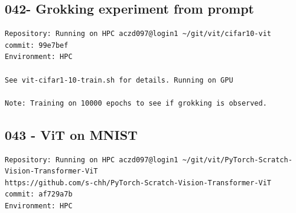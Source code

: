\subsection{042- Grokking experiment from prompt}
\label{app_res:042}
\begin{verbatim}
Repository: Running on HPC aczd097@login1 ~/git/vit/cifar10-vit
commit: 99e7bef
Environment: HPC

See vit-cifar1-10-train.sh for details. Running on GPU

Note: Training on 10000 epochs to see if grokking is observed.

\end{verbatim}

\subsection{043 - ViT on MNIST}
\label{app_res:043}
\begin{verbatim}
Repository: Running on HPC aczd097@login1 ~/git/vit/PyTorch-Scratch-Vision-Transformer-ViT
https://github.com/s-chh/PyTorch-Scratch-Vision-Transformer-ViT
commit: af729a7b
Environment: HPC

\end{verbatim}


